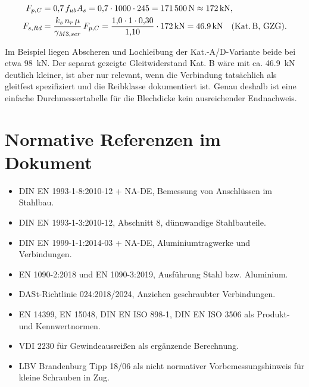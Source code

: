 \documentclass[10pt,a4paper]{article}
\begin{document}
\begin{align*}
F_{p,C} &= 0{,}7\,f_{ub}A_s = 0{,}7\cdot1000\cdot245 = \SI{171500}{N}\approx\SI{172}{kN},\\
F_{s,Rd} &= \frac{k_s\,n_r\,\mu}{\gamma_{M3,ser}}\,F_{p,C}
= \frac{1{,}0\cdot1\cdot0{,}30}{1{,}10}\cdot\SI{172}{kN}=\SI{46,9}{kN}\quad\text{(Kat.\,B, GZG)}.
\end{align*}

Im Beispiel liegen Abscheren und Lochleibung der Kat.-A/D-Variante beide bei etwa \SI{98}{kN}. Der separat gezeigte Gleitwiderstand Kat. B wäre mit ca. \SI{46,9}{kN} deutlich kleiner, ist aber nur relevant, wenn die Verbindung tatsächlich als gleitfest spezifiziert und die Reibklasse dokumentiert ist. Genau deshalb ist eine einfache Durchmessertabelle für die Blechdicke kein ausreichender Endnachweis.

\section{Normative Referenzen im Dokument}
\begin{itemize}
\item DIN EN 1993-1-8:2010-12 + NA-DE, Bemessung von Anschlüssen im Stahlbau.
\item DIN EN 1993-1-3:2010-12, Abschnitt 8, dünnwandige Stahlbauteile.
\item DIN EN 1999-1-1:2014-03 + NA-DE, Aluminiumtragwerke und Verbindungen.
\item EN 1090-2:2018 und EN 1090-3:2019, Ausführung Stahl bzw. Aluminium.
\item DASt-Richtlinie 024:2018/2024, Anziehen geschraubter Verbindungen.
\item EN 14399, EN 15048, DIN EN ISO 898-1, DIN EN ISO 3506 als Produkt- und Kennwertnormen.
\item VDI 2230 für Gewindeausreißen als ergänzende Berechnung.
\item LBV Brandenburg Tipp 18/06 als nicht normativer Vorbemessungshinweis für kleine Schrauben in Zug.
\end{itemize}
\end{document}
